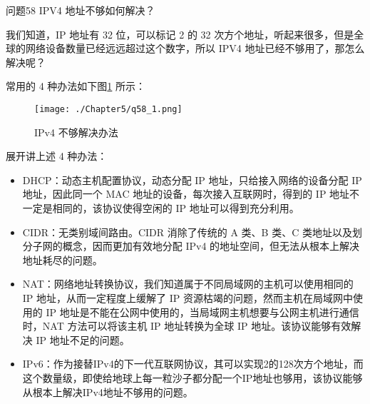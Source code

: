 \documentclass[cn,11pt,color=blue,lang=cn]{elegantbook}
\begin{document}
\begin{custom}{问题58}
IPV4 地址不够如何解决？
\end{custom}
\begin{solution}
我们知道，IP 地址有 32 位，可以标记 2 的 32 次方个地址，听起来很多，但是全球的网络设备数量已经远远超过这个数字，所以 IPV4 地址已经不够用了，那怎么解决呢？

常用的 4 种办法如下图\ref{fig58_1} 所示：
\begin{figure}[!h]
\centering
\texttt{[image: ./Chapter5/q58\_1.png]}
\caption{IPv4 不够解决办法}
\label{fig58_1}
\end{figure}

展开讲上述 4 种办法：
\begin{itemize}
	\item DHCP：动态主机配置协议，动态分配 IP 地址，只给接入网络的设备分配 IP 地址，因此同一个 MAC 地址的设备，每次接入互联网时，得到的 IP 地址不一定是相同的，该协议使得空闲的 IP 地址可以得到充分利用。
	\item CIDR：无类别域间路由。CIDR 消除了传统的 A 类、B 类、C 类地址以及划分子网的概念，因而更加有效地分配 IPv4 的地址空间，但无法从根本上解决地址耗尽的问题。
	\item NAT：网络地址转换协议，我们知道属于不同局域网的主机可以使用相同的 IP 地址，从而一定程度上缓解了 IP 资源枯竭的问题，然而主机在局域网中使用的 IP 地址是不能在公网中使用的，当局域网主机想要与公网主机进行通信时，NAT 方法可以将该主机 IP 地址转换为全球 IP 地址。该协议能够有效解决 IP 地址不足的问题。
	\item IPv6：作为接替IPv4的下一代互联网协议，其可以实现2的128次方个地址，而这个数量级，即使给地球上每一粒沙子都分配一个IP地址也够用，该协议能够从根本上解决IPv4地址不够用的问题。
\end{itemize}

\end{solution}
\end{document}
